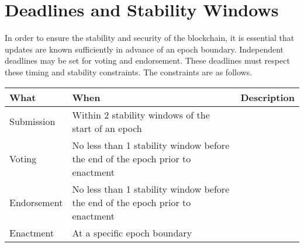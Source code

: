 \section{Deadlines and Stability Windows}



In order to ensure the stability and security of the blockchain, it is essential that updates are known sufficiently in advance of an epoch boundary.
Independent deadlines may be set for voting and endorsement.  These deadlines must respect these timing and stability constraints.
The constraints are as follows.

\begin{tabular}{||l|p{2in}|p{3in}||}
  \hline\hline
  \textbf{What} & \textbf{When} & \textbf{Description} \\
  \hline
  Submission & Within 2 stability windows of the start of an epoch & \\
  \hline
  Voting & No less than 1 stability window before the end of the epoch prior to enactment & \\
  \hline
  Endorsement & No less than 1 stability window before the end of the epoch prior to enactment & \\
  \hline
  Enactment & At a specific epoch boundary & \\
  \hline
\end{tabular}
